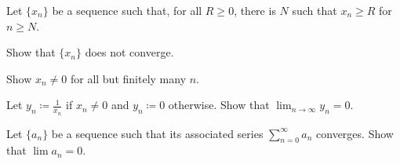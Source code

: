 \documentclass[../notes.tex]{subfiles}
\begin{document}
\begin{homework}
    Let $\{x_n\}$ be a sequence such that, for all $R\geq 0$, there is $N$ such that $x_n \geq R$ for $n\geq N$.
    \begin{listalph}
        \item Show that $\{x_n\}$ does not converge. 
        \item Show $x_n\neq0$ for all but finitely many $n$.  
        \item Let $y_n\coloneqq\frac{1}{x_n}$ if $x_n\neq 0$ and $y_n\coloneqq 0$ otherwise. Show that $\lim_{n\to\infty }y_n=0$.
    \end{listalph}
\end{homework}
\begin{homework}
    Let $\{a_n\}$ be a sequence such that its associated series $\sum_{n=0}^\infty a_n$ converges. Show that $\lim a_n =0$.
\end{homework}
\end{document}
